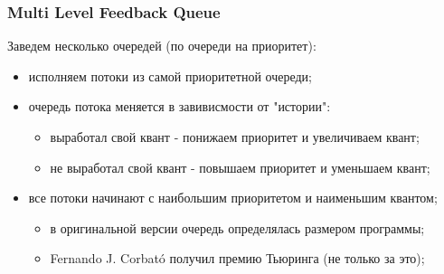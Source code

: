 \begin{frame}
\frametitle{Multi Level Feedback Queue}

Заведем несколько очередей (по очереди на приоритет):
\begin{itemize}
  \item<1-> исполняем потоки из самой приоритетной очереди;
  \item<2-> очередь потока меняется в завивисмости от "истории":
        \begin{itemize}
          \item выработал свой квант - понижаем приоритет и увеличиваем квант;
          \item не выработал свой квант - повышаем приоритет и уменьшаем квант;
        \end{itemize}
  \item<3-> все потоки начинают с наибольшим приоритетом и наименьшим квантом;
        \begin{itemize}
          \item в оригинальной версии очередь определялась размером программы;
          \item Fernando J. Corbató получил премию Тьюринга (не только за это);
        \end{itemize}
\end{itemize}
\end{frame}
